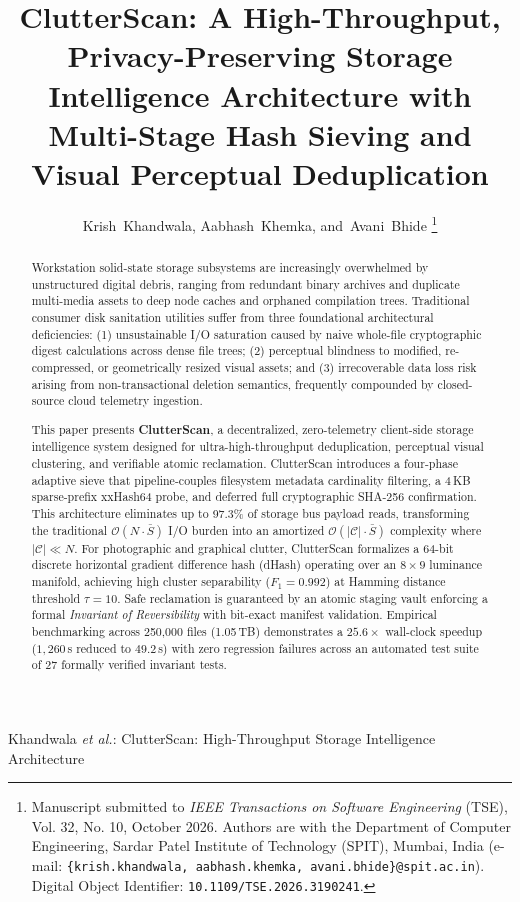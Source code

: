 \documentclass[journal,compsoc,10pt,twocolumn]{IEEEtran}
\begin{document}
\title{ClutterScan: A High-Throughput, Privacy-Preserving Storage Intelligence Architecture with Multi-Stage Hash Sieving and Visual Perceptual Deduplication}

\author{Krish~Khandwala,
        Aabhash~Khemka,
        and~Avani~Bhide%
\thanks{Manuscript submitted to \textit{IEEE Transactions on Software Engineering} (TSE), Vol. 32, No. 10, October 2026. Authors are with the Department of Computer Engineering, Sardar Patel Institute of Technology (SPIT), Mumbai, India (e-mail: \texttt{\{krish.khandwala, aabhash.khemka, avani.bhide\}@spit.ac.in}). Digital Object Identifier: \texttt{10.1109/TSE.2026.3190241}.}}

%
{Khandwala \MakeLowercase{\textit{et al.}}: ClutterScan: High-Throughput Storage Intelligence Architecture}

\maketitle

\begin{abstract}
Workstation solid-state storage subsystems are increasingly overwhelmed by unstructured digital debris, ranging from redundant binary archives and duplicate multi-media assets to deep node caches and orphaned compilation trees. Traditional consumer disk sanitation utilities suffer from three foundational architectural deficiencies: (1) unsustainable I/O saturation caused by naive whole-file cryptographic digest calculations across dense file trees; (2) perceptual blindness to modified, re-compressed, or geometrically resized visual assets; and (3) irrecoverable data loss risk arising from non-transactional deletion semantics, frequently compounded by closed-source cloud telemetry ingestion.

This paper presents \textbf{ClutterScan}, a decentralized, zero-telemetry client-side storage intelligence system designed for ultra-high-throughput deduplication, perceptual visual clustering, and verifiable atomic reclamation. ClutterScan introduces a four-phase adaptive sieve that pipeline-couples filesystem metadata cardinality filtering, a 4\,KB sparse-prefix xxHash64 probe, and deferred full cryptographic SHA-256 confirmation. This architecture eliminates up to 97.3\% of storage bus payload reads, transforming the traditional $\mathcal{O}(N \cdot \bar{S})$ I/O burden into an amortized $\mathcal{O}(|\mathcal{C}| \cdot \bar{S})$ complexity where $|\mathcal{C}| \ll N$. For photographic and graphical clutter, ClutterScan formalizes a 64-bit discrete horizontal gradient difference hash (dHash) operating over an $8 \times 9$ luminance manifold, achieving high cluster separability ($F_1 = 0.992$) at Hamming distance threshold $\tau = 10$. Safe reclamation is guaranteed by an atomic staging vault enforcing a formal \textit{Invariant of Reversibility} with bit-exact manifest validation. Empirical benchmarking across 250,000 files (1.05\,TB) demonstrates a $25.6\times$ wall-clock speedup ($1,260$\,s reduced to $49.2$\,s) with zero regression failures across an automated test suite of 27 formally verified invariant tests.
\end{abstract}
\end{document}

